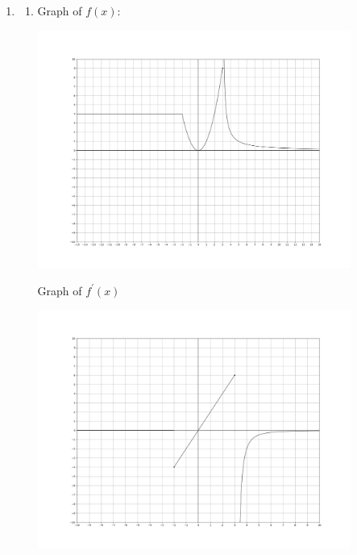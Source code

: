 \documentclass[11pt, letterpaper, twoside]{article}
\begin{document}
\begin{enumerate}
\item \begin{enumerate}[label=(\alph*)] %
\item Graph of \(f(x)\):

\includegraphics[width=0.85\textwidth]{q1a}

Graph of \(f^\prime(x)\)

\includegraphics[width=0.85\textwidth]{q2a}


\end{enumerate}
\end{enumerate}
\end{document}
